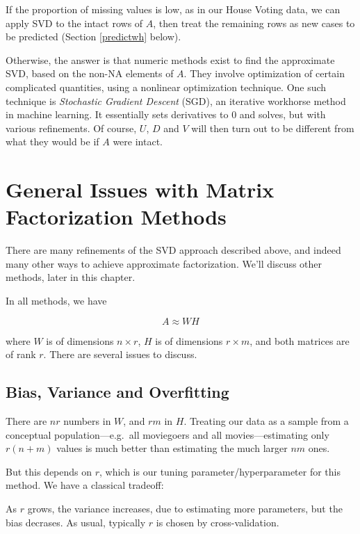 If the proportion of missing values is low, as in our House Voting data,
we can apply SVD to the intact rows of $A$, then treat the remaining
rows as new cases to be predicted (Section \ref{predictwh} below).

Otherwise, the answer is that numeric methods exist to find the
approximate SVD, based on the non-NA elements of $A$.  They involve
optimization of certain complicated quantities, using a nonlinear
optimization technique.  One such technique is \textit{Stochastic
Gradient Descent} (SGD), an iterative workhorse method in machine
learning.  It essentially sets derivatives to 0 and solves, but with
various refinements.  Of course, $U$, $D$ and $V$ will then turn out to
be different from what they would be if $A$ were intact.

\section{General Issues with Matrix Factorization Methods}  

There are many refinements of the SVD approach described above, and
indeed many other ways to achieve approximate factorization.  We'll
discuss other methods, later in this chapter.  

In all methods, we have

\begin{equation}
A \approx WH
\end{equation}

where $W$ is of dimensions $n \times r$,
$H$ is of dimensions $r \times m$, and both matrices are of rank $r$.
There are several issues to discuss.

\subsection{Bias, Variance and Overfitting}

There are $nr$ numbers in $W$, and $rm$ in $H$.  Treating our data as a
sample from a conceptual population---e.g.\ all moviegoers and all
movies---estimating only $r(n+m)$ values is much better than estimating
the much larger $nm$ ones.

But this depends on $r$, which is our tuning parameter/hyperparameter
for this method.  We have a classical tradeoff:

As $r$ grows, the variance increases, due to estimating more parameters,
but the bias decrases.  As usual, typically $r$ is chosen by
cross-validation.

